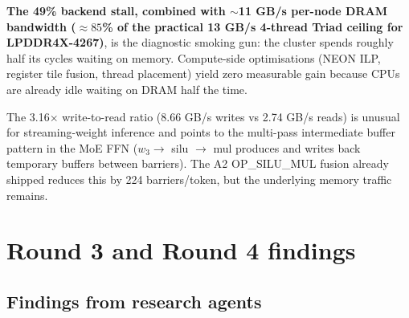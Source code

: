 \documentclass[10pt,a4paper]{article}
\begin{document}
\textbf{The 49\% backend stall, combined with $\sim$11 GB/s per-node DRAM bandwidth ($\approx 85$\% of the practical 13 GB/s 4-thread Triad ceiling for LPDDR4X-4267)}, is the diagnostic smoking gun: the cluster spends roughly half its cycles waiting on memory. Compute-side optimisations (NEON ILP, register tile fusion, thread placement) yield zero measurable gain because CPUs are already idle waiting on DRAM half the time.

The 3.16$\times$ write-to-read ratio (8.66 GB/s writes vs 2.74 GB/s reads) is unusual for streaming-weight inference and points to the multi-pass intermediate buffer pattern in the MoE FFN ($w_3 \to$ silu $\to$ mul produces and writes back temporary buffers between barriers). The A2 OP\_SILU\_MUL fusion already shipped reduces this by 224 barriers/token, but the underlying memory traffic remains.

\section{Round 3 and Round 4 findings}

\subsection{Findings from research agents}
\end{document}
